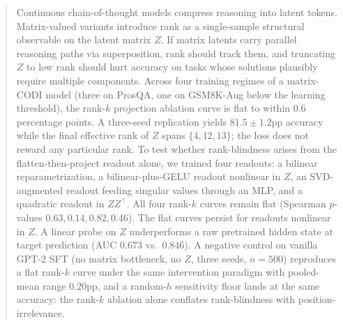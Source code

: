 \documentclass{article}
\theoremstyle{plain}
\theoremstyle{definition}
\newcommand{\Z}{Z}
\begin{document}

\printAffiliationsAndNotice{}  %

\begin{abstract}
Continuous chain-of-thought models compress reasoning into latent
tokens. Matrix-valued variants introduce rank as a single-sample
structural observable on the latent matrix $\Z$. If matrix latents
carry parallel reasoning paths via superposition, rank should track
them, and truncating $\Z$ to low rank should hurt accuracy on tasks
whose solutions plausibly require multiple components. Across four
training regimes of a matrix-CODI model (three on ProsQA, one on
GSM8K-Aug below the learning threshold), the rank-$k$ projection
ablation curve is flat to within 0.6 percentage points. A three-seed
replication yields $81.5 \pm 1.2$pp accuracy while the final
effective rank of $\Z$ spans $\{4, 12, 13\}$; the loss does not
reward any particular rank. To test whether rank-blindness arises
from the flatten-then-project readout alone, we trained four
readouts: a bilinear reparametrization, a bilinear-plus-GELU readout
nonlinear in $\Z$, an SVD-augmented readout feeding singular values
through an MLP, and a quadratic readout in $\Z\Z^\top$. All four
rank-$k$ curves remain flat (Spearman $p$-values $0.63, 0.14, 0.82,
0.46$). The flat curves persist for readouts nonlinear in $\Z$. A
linear probe on $\Z$ underperforms a raw pretrained hidden state
at target prediction (AUC $0.673$ vs.\ $0.846$). A negative control
on vanilla GPT-2 SFT (no matrix bottleneck, no $\Z$, three seeds,
$n\!=\!500$) reproduces a flat rank-$k$ curve under the same
intervention paradigm with pooled-mean range $0.20$pp, and a
random-$h$ sensitivity floor lands at the same accuracy: the
rank-$k$ ablation alone conflates rank-blindness with
position-irrelevance.
\end{abstract}














\end{document}
